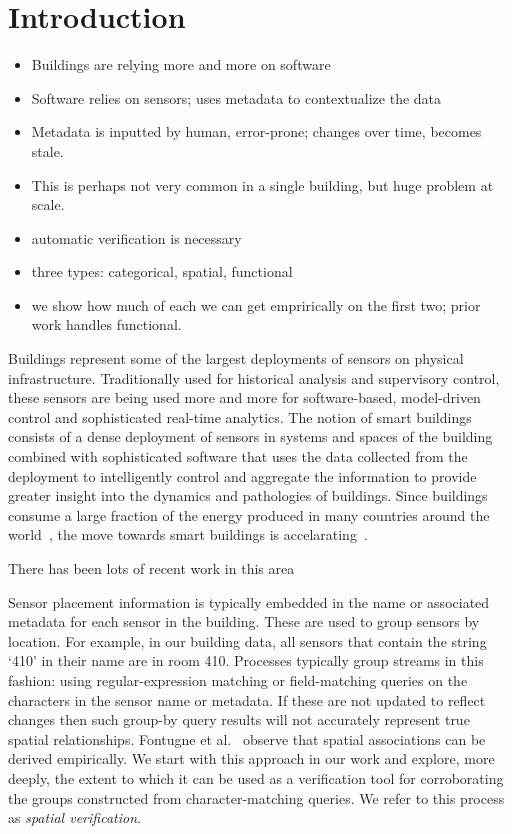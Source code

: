 \section{Introduction}
\label{sec:intro}


\begin{itemize}
\item Buildings are relying more and more on software 
\item Software relies on sensors; uses metadata to contextualize the data
\item Metadata is inputted by human, error-prone; changes over time, becomes stale.
\item This is perhaps not very common in a single building, but huge problem at scale.
\item automatic verification is necessary
\item three types: categorical, spatial, functional
\item we show how much of each we can get emprirically on the first two; prior work handles functional.
\end{itemize}

Buildings represent some of the largest deployments of sensors on physical infrastructure.  Traditionally used
for historical analysis and supervisory control, these sensors are being used more and more for software-based, model-driven
control and sophisticated real-time analytics.  The notion of smart buildings consists of a dense deployment of
sensors in systems and spaces of the building combined with sophisticated software that uses the data collected
from the deployment to intelligently control and aggregate the information to provide greater insight into the 
dynamics and pathologies of buildings.  Since buildings consume a large fraction of the energy produced
in many countries around the world~\cite{}, the move towards smart buildings is accelarating~\cite{}.

There has been lots of recent work in this area~\cite{BOSS, FIAP, smap, ucsd, bacnetip}

Sensor placement information is typically embedded in the name or associated metadata for each sensor in the building.
These are used to group sensors by location.  For example, in our building data, all sensors that contain the string
 `410' in their name are in room 410.  Processes typically group streams in this fashion: using regular-expression matching 
or field-matching queries on the characters in the sensor name or metadata.  If these are not updated to reflect changes
then such group-by query results will not accurately represent true spatial relationships.  
Fontugne et al.~\cite{IOT} observe that spatial associations can be derived empirically.  We start with this approach in our 
work and explore, more deeply, the extent to which it can be used 
as a verification tool for corroborating the groups constructed from character-matching queries.  We refer
to this process as \emph{spatial verification}.

